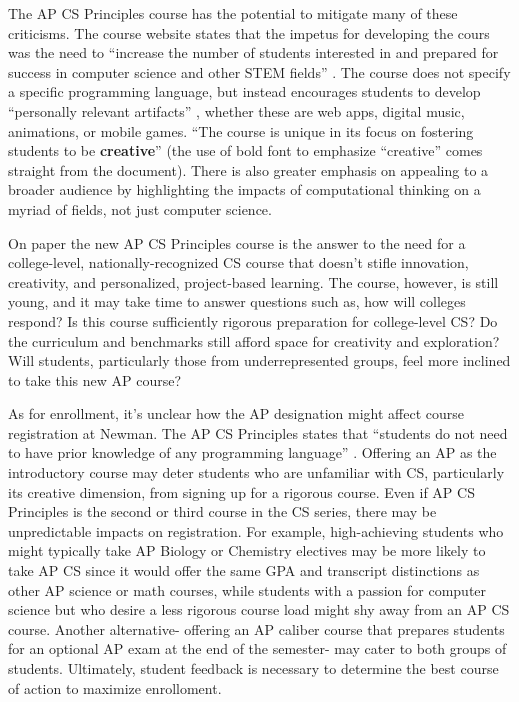 The AP CS Principles course has the potential to mitigate many of these criticisms. The course website states that the impetus for developing the cours was the need to ``increase the number of students interested in and prepared for success in computer science and other STEM fields'' \cite{apcsfaq}. The course does not specify a specific programming language, but instead encourages students to develop ``personally relevant artifacts'' \cite{apframe}, whether these are web apps, digital music, animations, or mobile games. ``The course is unique in its focus on fostering students to be \textbf{creative}'' \cite{apframe} (the use of bold font to emphasize ``creative'' comes straight from the document).  There is also greater emphasis on appealing to a broader audience by highlighting the impacts of computational thinking on a myriad of fields, not just computer science. \par

On paper the new AP CS Principles course is the answer to the need for a college-level, nationally-recognized CS course that doesn't stifle innovation, creativity, and personalized, project-based learning. The course, however, is still young, and it may take time to answer questions such as, how will colleges respond? Is this course sufficiently rigorous preparation for college-level CS? Do the curriculum and benchmarks still afford space for creativity and exploration? Will students, particularly those from underrepresented groups, feel more inclined to take this new AP course? \par
 
As for enrollment, it's unclear how the AP designation might affect course registration at Newman. The AP CS Principles states that ``students do not need to have prior knowledge of any programming language'' \cite{apcsfaq}. Offering an AP as the introductory course may deter students who are unfamiliar with CS, particularly its creative dimension, from signing up for a rigorous course. Even if AP CS Principles is the second or third course in the CS series, there may be unpredictable impacts on registration. For example, high-achieving students who might typically take AP Biology or Chemistry electives may be more likely to take AP CS since it would offer the same GPA and transcript distinctions as other AP science or math courses, while students with a passion for computer science but who desire a less rigorous course load might shy away from an AP CS course. Another alternative- offering an AP caliber course that prepares students for an optional AP exam at the end of the semester- may cater to both groups of students. Ultimately, student feedback is necessary to determine the best course of action to maximize enrolloment. \par


